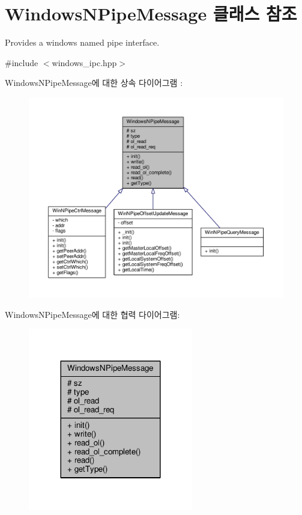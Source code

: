 \hypertarget{class_windows_n_pipe_message}{}\section{Windows\+N\+Pipe\+Message 클래스 참조}
\label{class_windows_n_pipe_message}


Provides a windows named pipe interface.  




{\ttfamily \#include $<$windows\+\_\+ipc.\+hpp$>$}



Windows\+N\+Pipe\+Message에 대한 상속 다이어그램 \+: 
\nopagebreak
\begin{figure}[H]
\begin{center}
\leavevmode
\includegraphics[width=350pt]{class_windows_n_pipe_message__inherit__graph}
\end{center}
\end{figure}


Windows\+N\+Pipe\+Message에 대한 협력 다이어그램\+:
\nopagebreak
\begin{figure}[H]
\begin{center}
\leavevmode
\includegraphics[width=204pt]{class_windows_n_pipe_message__coll__graph}
\end{center}
\end{figure}
